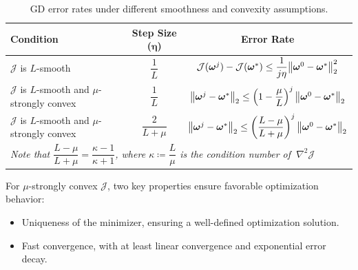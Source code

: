 \begin{table}[!htpb]
    \centering
    \begin{tabular}{lcc}
        \toprule
        \textbf{Condition} & \textbf{Step Size ($\bm\eta$)} & \textbf{Error Rate} \\ 
        \midrule
        $\mathcal{J}$ is $L$-smooth  & $\dfrac{1}{L}$  & $\mathcal{J}(\bm\omega^{j}) - \mathcal{J}(\bm\omega^{*}) \le \dfrac{1}{j\eta}\norm{\bm\omega^0 - \bm\omega^*}_2^2$  \\
        \midrule
        \makecell{$\mathcal{J}$ is $L$-smooth and\\$\mu$-strongly convex}   & $\dfrac{1}{L}$ & $\norm{\bm\omega^{j} - \bm\omega^{*}}_2 \le \left(1-\dfrac{\mu}{L}\right)^j\norm{\bm\omega^0 - \bm\omega^*}_2$  \\
        \midrule
        \makecell{$\mathcal{J}$ is $L$-smooth and\\$\mu$-strongly convex}   & $\dfrac{2}{L+\mu}$   & $\norm{\bm\omega^{j} - \bm\omega^{*}}_2 \le \left(\dfrac{L-\mu}{L+\mu}\right)^j\norm{\bm\omega^0 - \bm\omega^*}_2$  \\
        [1.5em]
        \multicolumn{3}{l}{\textit{Note that $\dfrac{L-\mu}{L+\mu}=\dfrac{\kappa-1}{\kappa+1}$, where $\kappa\coloneqq\dfrac{L}{\mu}$ is the condition number of $~\nabla^2\mathcal{J}$}} \\
        \bottomrule
    \end{tabular}
    \caption{GD error rates under different smoothness and convexity assumptions.}
    \label{tab:table-01}
\end{table}

For $\mu$-strongly convex $\mathcal{J}$, two key properties ensure favorable optimization behavior:
\begin{itemize}
    \item Uniqueness of the minimizer, ensuring a well-defined optimization solution.
    \item Fast convergence, with at least linear convergence and exponential error decay. 
\end{itemize}

